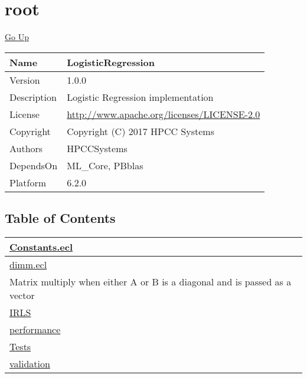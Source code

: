 \chapter*{\color{headtoc} root}
\hypertarget{ecldoc:toc:root}{}
\hyperlink{ecldoc:toc:}{Go Up}

\begin{tabularx}{\textwidth}{|l|X|}
\hline
Name &
LogisticRegression
 \\
\hline
Version &
1.0.0
 \\
\hline
Description &
Logistic Regression implementation
 \\
\hline
License &
\url{http://www.apache.org/licenses/LICENSE-2.0}
 \\
\hline
Copyright &
Copyright (C) 2017 HPCC Systems
 \\
\hline
Authors &
HPCCSystems
 \\
\hline
DependsOn &
ML\_Core, PBblas
 \\
\hline
Platform &
6.2.0
 \\
\hline
\end{tabularx}

\section*{Table of Contents}
{\renewcommand{\arraystretch}{1.5}
\begin{longtable}{|p{\textwidth}|}
\hline
\hyperlink{ecldoc:toc:Constants}{Constants.ecl} \\
\hline
\hyperlink{ecldoc:toc:dimm}{dimm.ecl} \\
Matrix multiply when either A or B is a diagonal and is passed as a vector \\
\hline
\hyperlink{ecldoc:toc:root/IRLS}{IRLS} \\
\hline
\hyperlink{ecldoc:toc:root/performance}{performance} \\
\hline
\hyperlink{ecldoc:toc:root/Tests}{Tests} \\
\hline
\hyperlink{ecldoc:toc:root/validation}{validation} \\
\hline
\end{longtable}
}







